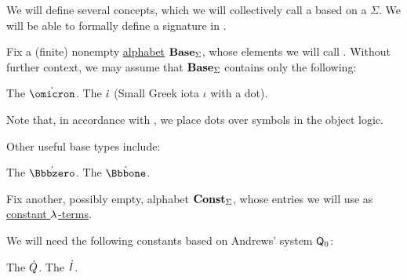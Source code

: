 \begin{definition}\label{def:simple_type_system}\mimprovised
  We will define several concepts, which we will collectively call a  based on a  \( \Sigma \). We will be able to formally define a signature in .

  \begin{thmenum}[resume=def:simple_type_system]
     Fix a (finite) nonempty \hyperref[def:formal_language/alphabet]{alphabet} \( \op*{Base}_\Sigma \), whose elements we will call . Without further context, we may assume that \( \op*{Base}_\Sigma \) contains only the following:
    \begin{thmenum}[series=def:simple_type_system/base]
       The  \( \synomicron \).
       The  \( \dot\iota \) (Small Greek iota \( \iota \) with a dot).
    \end{thmenum}

    Note that, in accordance with , we place dots over symbols in the object logic.

    Other useful base types include:
    \begin{thmenum}[resume=def:simple_type_system/base]
       The  \( \syn\Bbbzero \).
       The  \( \syn\Bbbone \).
    \end{thmenum}

     Fix another, possibly empty, alphabet \( \op*{Const}_\Sigma \), whose entries we will use as \hyperref[def:lambda_term/const]{constant \( \mathrm{\lambda} \)-terms}.

    We will need the following constants based on Andrews' system \( \textsf{Q}_0 \):
    \begin{thmenum}
       The  \( {\dot{Q}} \).
       The  \( {\dot{I}} \).
    \end{thmenum}


\end{thmenum}
\end{definition}
